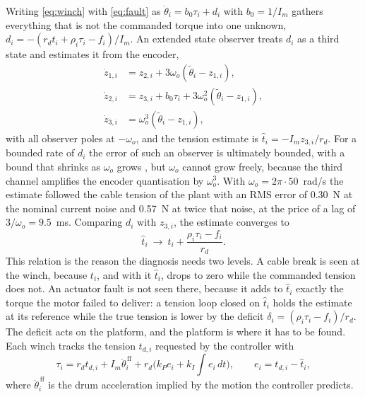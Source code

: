 \documentclass{interact}
\begin{document}
Writing \eqref{eq:winch} with \eqref{eq:fault} as $\ddot\theta_i=b_0\tau_i+d_i$ with $b_0=1/I_m$ gathers everything that is not the commanded torque into one unknown, $d_i=-(r_dt_i+\rho_i\tau_i-f_i)/I_m$. An extended state observer \citep{han2009pid} treats $d_i$ as a third state and estimates it from the encoder,
\begin{equation}\label{eq:eso}
\begin{aligned}
\dot z_{1,i}&=z_{2,i}+3\omega_o(\tilde\theta_i-z_{1,i}),\\
\dot z_{2,i}&=z_{3,i}+b_0\tau_i+3\omega_o^2(\tilde\theta_i-z_{1,i}),\\
\dot z_{3,i}&=\omega_o^3(\tilde\theta_i-z_{1,i}),
\end{aligned}
\end{equation}
with all observer poles at $-\omega_o$, and the tension estimate is $\hat t_i=-I_m z_{3,i}/r_d$. For a bounded rate of $d_i$ the error of such an observer is ultimately bounded, with a bound that shrinks as $\omega_o$ grows \citep{guo2011eso}, but $\omega_o$ cannot grow freely, because the third channel amplifies the encoder quantisation by $\omega_o^3$. With $\omega_o=2\pi\cdot50$~rad/s the estimate followed the cable tension of the plant with an RMS error of 0.30~N at the nominal current noise and 0.57~N at twice that noise, at the price of a lag of $3/\omega_o=9.5$~ms. Comparing $d_i$ with $z_{3,i}$, the estimate converges to
\begin{equation}\label{eq:bias}
\hat t_i\ \to\ t_i+\frac{\rho_i\tau_i-f_i}{r_d}.
\end{equation}
This relation is the reason the diagnosis needs two levels. A cable break is seen at the winch, because $t_i$, and with it $\hat t_i$, drops to zero while the commanded tension does not. An actuator fault is not seen there, because it adds to $\hat t_i$ exactly the torque the motor failed to deliver: a tension loop closed on $\hat t_i$ holds the estimate at its reference while the true tension is lower by the deficit $\delta_i=(\rho_i\tau_i-f_i)/r_d$. The deficit acts on the platform, and the platform is where it has to be found. Each winch tracks the tension $t_{d,i}$ requested by the controller with
\begin{equation}\label{eq:loop}
\tau_i=r_dt_{d,i}+I_m\ddot\theta_i^{\,\mathrm{ff}}+r_d\Big(k_Pe_i+k_I\!\int e_i\,dt\Big),\qquad e_i=t_{d,i}-\hat t_i,
\end{equation}
where $\ddot\theta_i^{\,\mathrm{ff}}$ is the drum acceleration implied by the motion the controller predicts.
\end{document}
